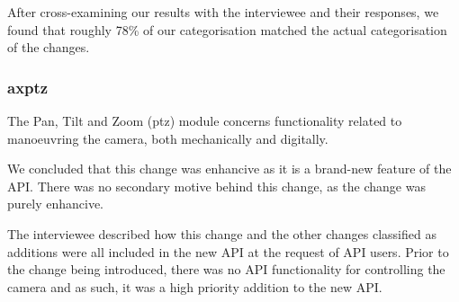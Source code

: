 \documentclass{sig-alternate}
\begin{document}
After cross-examining our results with the interviewee and their responses, we found that roughly 78\% of our categorisation matched the actual categorisation of the changes.







\subsubsection{axptz}
The Pan, Tilt and Zoom (ptz) module concerns functionality related to manoeuvring the camera, both mechanically and digitally. 

We concluded that this change was enhancive as it is a brand-new feature of the API. There was no secondary motive behind this change, as the change was purely enhancive. 


The interviewee described how this change and the other changes classified as additions were all included in the new API at the request of API users. Prior to the change being introduced, there was no API functionality for controlling the camera and as such, it was a high priority addition to the new API. 
\end{document}
